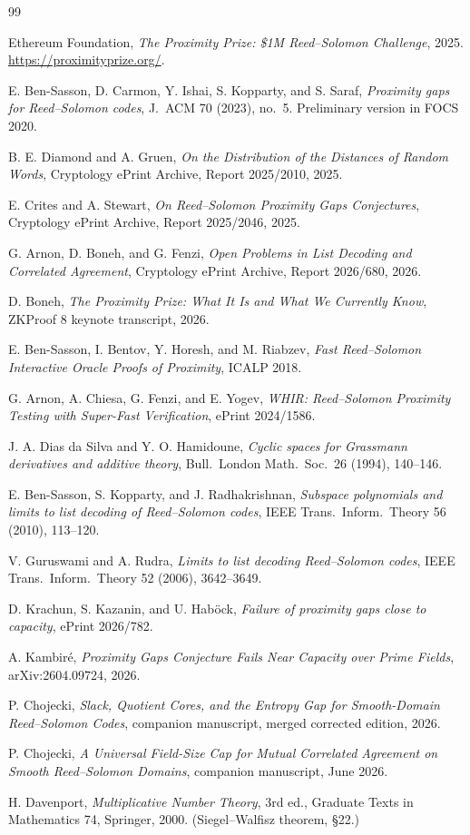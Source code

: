 \documentclass[11pt]{article}
\theoremstyle{definition}
\begin{document}
\begin{thebibliography}{99}

Ethereum Foundation,
\emph{The Proximity Prize: \$1M Reed--Solomon Challenge}, 2025.
\url{https://proximityprize.org/}.

E. Ben-Sasson, D. Carmon, Y. Ishai, S. Kopparty, and S. Saraf,
\emph{Proximity gaps for Reed--Solomon codes},
J.\ ACM 70 (2023), no.~5.  Preliminary version in FOCS 2020.

B. E. Diamond and A. Gruen,
\emph{On the Distribution of the Distances of Random Words},
Cryptology ePrint Archive, Report 2025/2010, 2025.

E. Crites and A. Stewart,
\emph{On Reed--Solomon Proximity Gaps Conjectures},
Cryptology ePrint Archive, Report 2025/2046, 2025.

G. Arnon, D. Boneh, and G. Fenzi,
\emph{Open Problems in List Decoding and Correlated Agreement},
Cryptology ePrint Archive, Report 2026/680, 2026.

D. Boneh,
\emph{The Proximity Prize: What It Is and What We Currently Know},
ZKProof 8 keynote transcript, 2026.

E. Ben-Sasson, I. Bentov, Y. Horesh, and M. Riabzev,
\emph{Fast Reed--Solomon Interactive Oracle Proofs of Proximity},
ICALP 2018.

G. Arnon, A. Chiesa, G. Fenzi, and E. Yogev,
\emph{WHIR: Reed--Solomon Proximity Testing with Super-Fast Verification},
ePrint 2024/1586.

J. A. Dias da Silva and Y. O. Hamidoune,
\emph{Cyclic spaces for Grassmann derivatives and additive theory},
Bull.\ London Math.\ Soc.\ 26 (1994), 140--146.

E. Ben-Sasson, S. Kopparty, and J. Radhakrishnan,
\emph{Subspace polynomials and limits to list decoding of Reed--Solomon codes},
IEEE Trans.\ Inform.\ Theory 56 (2010), 113--120.

V. Guruswami and A. Rudra,
\emph{Limits to list decoding Reed--Solomon codes},
IEEE Trans.\ Inform.\ Theory 52 (2006), 3642--3649.

D. Krachun, S. Kazanin, and U. Hab\"ock,
\emph{Failure of proximity gaps close to capacity},
ePrint 2026/782.

A. Kambir\'e,
\emph{Proximity Gaps Conjecture Fails Near Capacity over Prime Fields},
arXiv:2604.09724, 2026.

P. Chojecki,
\emph{Slack, Quotient Cores, and the Entropy Gap for Smooth-Domain Reed--Solomon Codes},
companion manuscript, merged corrected edition, 2026.

P. Chojecki,
\emph{A Universal Field-Size Cap for Mutual Correlated Agreement on Smooth Reed--Solomon Domains},
companion manuscript, June 2026.

H. Davenport,
\emph{Multiplicative Number Theory}, 3rd ed., Graduate Texts in Mathematics 74, Springer, 2000.
(Siegel--Walfisz theorem, \S22.)

\end{thebibliography}
\end{document}
